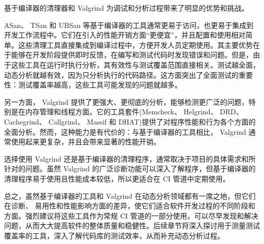 基于编译器的清理器和 Valgrind 为调试和分析过程带来了明显的优势和挑战。

ASan、 TSan 和 UBSan 等基于编译器的工具通常更易于访问，也更易于集成到开发工作流程中。它们在引入的性能开销方面“更便宜”，并且配置和使用相对简单。这些清理工具直接集成到编译过程中，方便开发人员定期使用。其主要优势在于能够在开发阶段提供即时反馈，在编写和测试代码时发现错误和问题。但是，由于这些工具在运行时执行分析，其有效性与测试覆盖范围直接相关。测试越全面，动态分析就越有效，因为只分析执行的代码路径。这方面突出了全面测试的重要性：测试覆盖率越高，这些工具可能发现的问题就越多。

另一方面， Valgrind 提供了更强大、更彻底的分析，能够检测更广泛的问题，特别是在内存管理和线程方面。它的工具套件(Memcheck、 Helgrind、 DRD、 Cachegrind、 Callgrind、 Massif 和 DHAT)提供了对程序性能和行为各个方面的全面分析。然而，这种能力是有代价的：与基于编译器的工具相比， Valgrind 通常使用起来更复杂，并且会带来显著的性能开销。

选择使用 Valgrind 还是基于编译器的清理程序，通常取决于项目的具体需求和所针对的问题。虽然 Valgrind 的广泛诊断功能可以深入了解程序，但基于编译器的清理程序易于使用且性能成本较低，所以更适合在 CI 管道中定期使用。

总之，虽然基于编译器的工具和 Valgrind 在动态分析领域都有一席之地，但它们在诊断、 易用性和性能影响方面的差异，使它们适合软件开发过程的不同阶段和方面。强烈建议将这些工具作为常规 CI 管道的一部分使用，可以尽早发现和解决问题，从而大大提高软件的整体质量和稳健性。后续章节将深入探讨用于测量测试覆盖率的工具，深入了解代码库的测试效率，从而补充动态分析过程。
